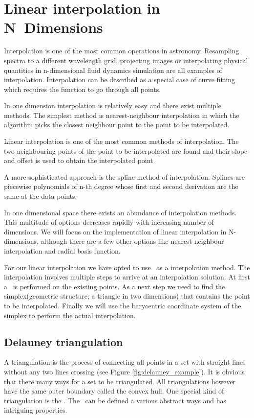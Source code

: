 \chapter{Linear interpolation in N~Dimensions}
\label{chap:ndinterp}

Interpolation is one of the most common operations in astronomy. Resampling spectra to a different wavelength grid, projecting images or interpolating physical quantities in n-dimensional fluid dynamics simulation are all examples of interpolation.
Interpolation can be described as a special case of curve fitting which requires the function to go through all points. 

In one dimension interpolation is relatively easy and there exist multiple methods. The simplest method is nearest-neighbour interpolation in which the algorithm picks the closest neighbour point to the point to be interpolated. 

Linear interpolation is one of the most common methods of interpolation. The two neighbouring points of the point to be interpolated are found and their slope and offset is used to obtain the interpolated point.

A more sophisticated approach is the spline-method of interpolation. Splines are piecewise polynomials of n-th degree whose first and second derivation are the same at the data points.

In one dimensional space there exists an abundance of interpolation methods. This multitude of options decreases rapidly with increasing number of dimensions. 
We will focus on the implementation of linear interpolation in N-dimensions, although there are a few other options like nearest neighbour interpolation and radial basis function.

For our linear interpolation we have opted to use \deltri\ as a interpolation method. The interpolation involves multiple steps to arrive at an interpolation solution: At first a \deltri\ is performed on the existing points. As a next step we need to find the simplex(geometric structure; a triangle in two dimensions) that contains the point to be interpolated. 
Finally we will use the barycentric coordinate system of the simplex to perform the actual interpolation.






\section{Delauney triangulation}
\label{sec:delauney_tri}
A triangulation is the process of connecting all points in a set with straight lines without any two lines crossing (see Figure \ref{fig:delauney_example}). It is obvious that there many ways for a set to be triangulated. All triangulations however have the same outer boundary called the convex hull. One special kind of triangulation is the \deltri. The \deltri\ can be defined a various abstract ways and has intriguing properties.

